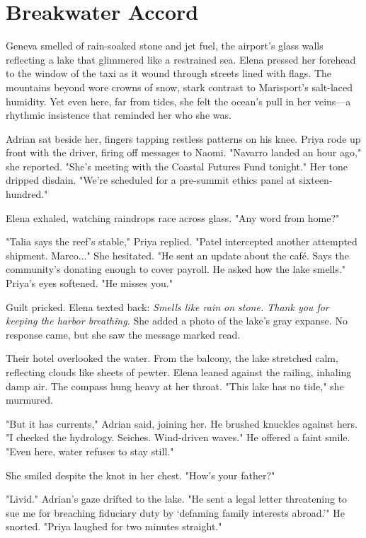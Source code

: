 \chapter{Breakwater Accord}

Geneva smelled of rain-soaked stone and jet fuel, the airport's glass walls reflecting a lake that glimmered like a restrained sea. Elena pressed her forehead to the window of the taxi as it wound through streets lined with flags. The mountains beyond wore crowns of snow, stark contrast to Marisport's salt-laced humidity. Yet even here, far from tides, she felt the ocean's pull in her veins—a rhythmic insistence that reminded her who she was.

Adrian sat beside her, fingers tapping restless patterns on his knee. Priya rode up front with the driver, firing off messages to Naomi. "Navarro landed an hour ago," she reported. "She's meeting with the Coastal Futures Fund tonight." Her tone dripped disdain. "We're scheduled for a pre-summit ethics panel at sixteen-hundred."

Elena exhaled, watching raindrops race across glass. "Any word from home?"

"Talia says the reef's stable," Priya replied. "Patel intercepted another attempted shipment. Marco..." She hesitated. "He sent an update about the café. Says the community's donating enough to cover payroll. He asked how the lake smells." Priya's eyes softened. "He misses you."

Guilt pricked. Elena texted back: \textit{Smells like rain on stone. Thank you for keeping the harbor breathing.} She added a photo of the lake's gray expanse. No response came, but she saw the message marked read.

Their hotel overlooked the water. From the balcony, the lake stretched calm, reflecting clouds like sheets of pewter. Elena leaned against the railing, inhaling damp air. The compass hung heavy at her throat. "This lake has no tide," she murmured.

"But it has currents," Adrian said, joining her. He brushed knuckles against hers. "I checked the hydrology. Seiches. Wind-driven waves." He offered a faint smile. "Even here, water refuses to stay still."

She smiled despite the knot in her chest. "How's your father?"

"Livid." Adrian's gaze drifted to the lake. "He sent a legal letter threatening to sue me for breaching fiduciary duty by `defaming family interests abroad.'" He snorted. "Priya laughed for two minutes straight."

